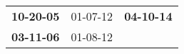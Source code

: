 \begin{supertabular}{p{0.33\columnwidth}p{0.33\columnwidth}p{0.33\columnwidth}}
 \textbf{10-20-05\textsuperscript{}} &  01-07-12\textsuperscript{} &  \textbf{04-10-14\textsuperscript{}} \\
 \textbf{03-11-06\textsuperscript{}} &  01-08-12\textsuperscript{} &                                      \\
\end{supertabular}
